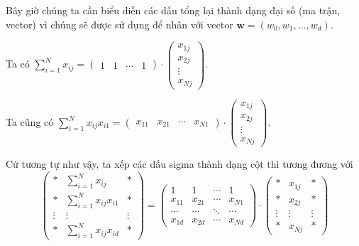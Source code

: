 \documentclass{mynotes}
\begin{document}
Bây giờ chúng ta cần biểu diễn các dấu tổng lại thành dạng đại số (ma trận, vector) vì chúng sẽ được sử dụng để nhân với vector $\bm{w} = (w_0, w_1, \ldots, w_d)$.

Ta có $\sum_{i=1}^N x_{ij} = \begin{pmatrix}
    1 & 1 & \cdots & 1
\end{pmatrix} \cdot \begin{pmatrix}
    x_{1j} \\ x_{2j} \\ \vdots \\ x_{Nj}
\end{pmatrix}$.

Ta cũng có $\sum_{i=1}^N x_{ij} x_{i1} = \begin{pmatrix}
    x_{11} & x_{21} & \cdots & x_{N1}
\end{pmatrix} \cdot \begin{pmatrix}
    x_{1j} \\ x_{2j} \\ \vdots \\ x_{Nj}
\end{pmatrix}$.

Cứ tương tự như vậy, ta xếp các dấu sigma thành dạng cột thì tương đương với \[\begin{pmatrix}
    * & \sum_{i=1}^N x_{ij} & * \\ * & \sum_{i=1}^N x_{ij} x_{i1} & * \\ \vdots & \vdots & \vdots \\ * & \sum_{i=1}^N x_{ij} x_{id} & *
\end{pmatrix} = \begin{pmatrix}
    1 & 1 & \cdots & 1 \\ x_{11} & x_{21} & \cdots & x_{N1} \\ \cdots & \cdots & \ddots & \cdots \\ x_{1d} & x_{2d} & \cdots & x_{Nd} 
\end{pmatrix} \cdot \begin{pmatrix}
    * & x_{1j} & * \\ * & x_{2j} & * \\ \vdots & \vdots & \vdots \\ * & x_{Nj} & *
\end{pmatrix}\]
\end{document}
